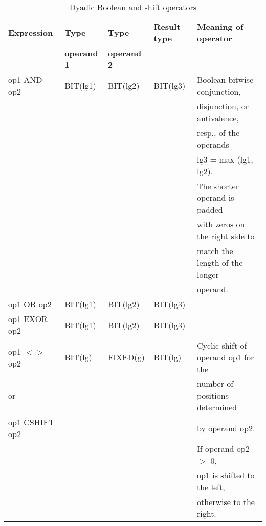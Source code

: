 \begin{table} %
\begin{center}
\caption{Dyadic Boolean and shift operators}
\label{tab77}
\vspace{5mm}
\begin{tabular}{|l|l|l|l|l|}
\hline
{\bf Expression} & {\bf Type}      & {\bf Type}      & {\bf Result type} & {\bf Meaning of operator}\\
                 & {\bf operand 1} & {\bf operand 2} &                   & \\ \hline

op1 AND op2      & BIT(lg1)        & BIT(lg2)        & BIT(lg3)          & Boolean bitwise conjunction,\\  
                 &                 &                 &                   & disjunction, or antivalence,\\
                 &                 &                 &                   & resp., of the operands\\
                 &                 &                 &                   & lg3 = max (lg1, lg2).\\
                 &                 &                 &                   & The shorter operand is padded\\
                 &                 &                 &                   & with zeros on the right side to\\
                 &                 &                 &                   & match the length of the longer\\
                 &                 &                 &                   & operand.\\ \cline{1-4}
op1 OR op2       & BIT(lg1)        & BIT(lg2)        & BIT(lg3)          & \\ \cline{1-4}
op1 EXOR op2     & BIT(lg1)        & BIT(lg2)        & BIT(lg3)          & \\ \hline

op1 $<>$ op2     & BIT(lg)         & FIXED(g)        & BIT(lg)           & Cyclic shift of operand op1 for the\\
or               &                 &                 &                   & number of positions determined\\
op1 CSHIFT op2   &                 &                 &                   & by operand op2.\\
                 &                 &                 &                   & If operand op2 $>$ 0,\\
                 &                 &                 &                   & op1 is shifted to the left,\\
                 &                 &                 &                   & otherwise to the right.\\ \hline


\end{tabular}
\end{center}
\end{table}
